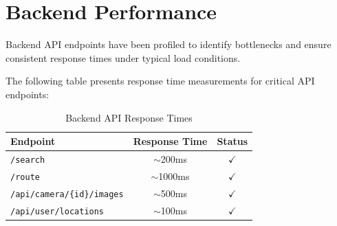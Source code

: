 

    
    
    

\section{Backend Performance}

Backend API endpoints have been profiled to identify bottlenecks and ensure consistent response times under typical load conditions.

The following table presents response time measurements for critical API endpoints:

\begin{table}[H]
\centering
\begin{tabular}{|l|c|c|}
\hline
\textbf{Endpoint} & \textbf{Response Time} & \textbf{Status} \\
\hline
\texttt{/search} & $\sim$200ms & $\checkmark$ \\
\texttt{/route} & $\sim$1000ms & $\checkmark$ \\
\texttt{/api/camera/\{id\}/images} & $\sim$500ms & $\checkmark$ \\
\texttt{/api/user/locations} & $\sim$100ms & $\checkmark$ \\
\hline
\end{tabular}
\caption{Backend API Response Times}
\end{table}

